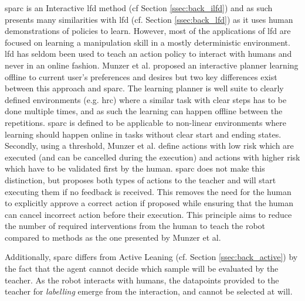 \gls{sparc} is an Interactive \gls{lfd} method (cf Section \ref{ssec:back_ilfd}) and as such presents many similarities with \acrlong{lfd} (cf. Section \ref{ssec:back_lfd}) as it uses human demonstrations of policies to learn. However, most of the applications of \gls{lfd} \citep{argall2009survey,billard2008robot} are focused on learning a manipulation skill in a mostly deterministic environment. \gls{lfd} has seldom been used to teach an action policy to interact with humans \citep{liu2014train,sequeira2016discovering,munzer2017efficient} and never in an online fashion. Munzer et al. proposed an interactive planner learning offline to current user's preferences and desires but two key differences exist between this approach and \gls{sparc}. The learning planner is well suite to clearly defined environments (e.g. \gls{hrc}) where a similar task with clear steps has to be done multiple times, and as such the learning can happen offline between the repetitions. \gls{sparc} is defined to be applicable to non-linear environments where learning should happen online in tasks without clear start and ending states. Secondly, using a threshold, Munzer et al. define actions with low risk which are executed (and can be cancelled during the execution) and actions with higher risk which have to be validated first by the human. \gls{sparc} does not make this distinction, but proposes both types of actions to the teacher and will start executing them if no feedback is received. This removes the  need for the human to explicitly approve a correct action if proposed while ensuring that the human can cancel incorrect action before their execution. This principle aims to reduce the number of required interventions from the human to teach the robot compared to methods as the one presented by Munzer et al. 

Additionally, \gls{sparc} differs from Active Leaning (cf. Section \ref{ssec:back_active}) by the fact that the agent cannot decide which sample will be evaluated by the teacher. As the robot interacts with humans, the datapoints provided to the teacher for \textit{labelling} emerge from the interaction, and cannot be selected at will. 
    

